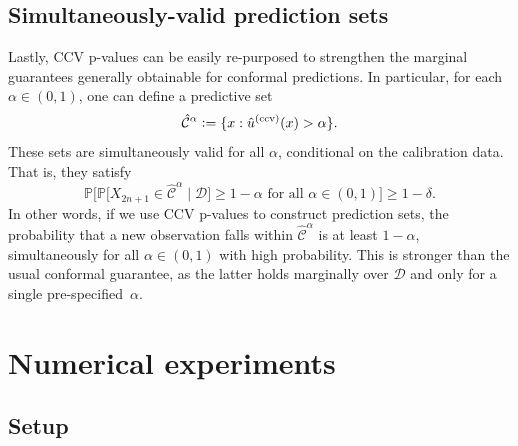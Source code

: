 \documentclass[11pt]{article}
\newcommand{\defeq}{\vcentcolon=}
\def\C{\mathcal{C}}
\def\Chat{\hat{\mathcal{C}}}
\def\cond{\textnormal{(ccv)}}
\renewcommand{\P}{\mathbb{P}}
\begin{document}
\subsection{Simultaneously-valid prediction sets} \label{sec:predictive-sets}
Lastly, CCV p-values can be easily re-purposed to strengthen the marginal guarantees generally obtainable for conformal predictions.
In particular, for each $\alpha \in (0,1)$, one can define a predictive set
\begin{equation} \label{eq:simult_pred_sets_def}
    \Chat^\alpha \defeq \{x : \hat{u}^\cond(x) > \alpha\}.
\end{equation}
These sets are simultaneously valid for all $\alpha$, conditional on the calibration data. That is, they satisfy
\begin{equation}
\label{eq:simult_sets_def}
    \P\bigg[ \P\big[X_{2n+1} \in \hat{\C}^\alpha \mid \mathcal{D} \big] \ge 1 - \alpha \text{ for all } \alpha \in (0,1) \bigg] \ge 1 - \delta.
\end{equation}
In other words, if we use CCV p-values to construct prediction sets, the probability that a new observation falls within $\Chat^\alpha$ is at least $1-\alpha$, simultaneously for all $\alpha \in (0,1)$ with high probability. This is stronger than the usual conformal guarantee, as the latter holds marginally over $\mathcal{D}$ and only for a single pre-specified~$\alpha$.



\section{Numerical experiments} \label{sec:exp}

\subsection{Setup} \label{sec:exp-setup}
\end{document}
